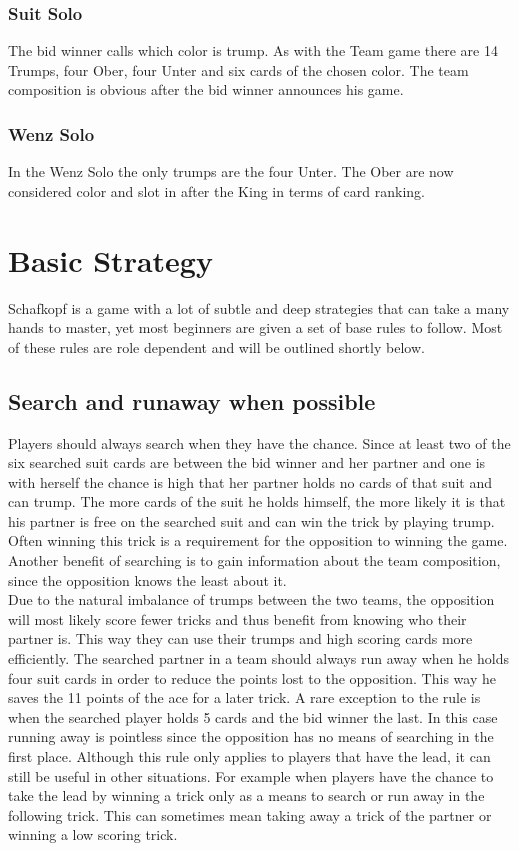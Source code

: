 \subsubsection{Suit Solo}
The bid winner calls which color is trump.
As with the Team game there are 14 Trumps, four Ober, four Unter and six cards of the chosen color.
The team composition is obvious after the bid winner announces his game.

\subsubsection{Wenz Solo}
In the Wenz Solo the only trumps are the four Unter.
The Ober are now considered color and slot in after the King in terms of card ranking.


\section{Basic Strategy}
Schafkopf is a game with a lot of subtle and deep strategies that can take a many hands to master, yet most beginners
are given a set of base rules to follow.
Most of these rules are role dependent and will be outlined shortly below.

\subsection{Search and runaway when possible}
Players should always search when they have the chance.
Since at least two of the six searched suit cards are between the bid winner and her partner and one is with herself
the chance is high that her partner holds no cards of that suit and can trump.
The more cards of the suit he holds himself, the more likely it is that his partner is free on the searched suit and
can win the trick by playing trump.
Often winning this trick is a requirement for the opposition to winning the game.
Another benefit of searching is to gain information about the team composition, since the opposition knows the least
about it.\\
Due to the natural imbalance of trumps between the two teams, the opposition will most likely score fewer tricks and
thus benefit from knowing who their partner is.
This way they can use their trumps and high scoring cards more efficiently.
\newline
The searched partner in a team should always run away when he holds four suit cards in order to reduce the points lost
to the opposition.
This way he saves the 11 points of the ace for a later trick.
A rare exception to the rule is when the searched player holds 5 cards and the bid winner the last.
In this case running away is pointless since the opposition has no means of searching in the first place.
\newline
Although this rule only applies to players that have the lead, it can still be useful in other situations.
For example when players have the chance to take the lead by winning a trick only as a means to search or run away in
the following trick.
This can sometimes mean taking away a trick of the partner or winning a low scoring trick.

